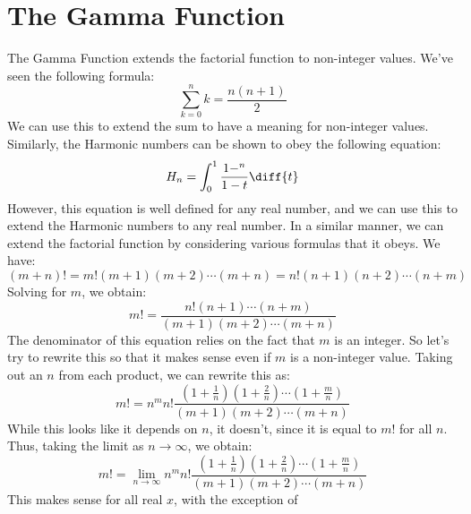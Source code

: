 \documentclass[crop=false,class=book,oneside]{standalone}
\begin{document}
    \section{The Gamma Function}
        The Gamma Function extends the factorial function to
        non-integer values. We've seen the following formula:
        \begin{equation}
            \sum_{k=0}^{n}k=\frac{n(n+1)}{2}
        \end{equation}
        We can use this to extend the sum to have a meaning for
        non-integer values. Similarly, the Harmonic numbers can be
        shown to obey the following equation:
        \begin{equation}
            H_{n}=\int_{0}^{1}\frac{1-^{n}}{1-t}\diff{t}
        \end{equation}
        However, this equation is well defined for any real number,
        and we can use this to extend the Harmonic numbers to any
        real number. In a similar manner, we can extend the factorial
        function by considering various formulas that it obeys. We have:
        \begin{equation}
            (m+n)!=m!(m+1)(m+2)\cdots(m+n)=n!(n+1)(n+2)\cdots(n+m)
        \end{equation}
        Solving for $m$, we obtain:
        \begin{equation}
            m!=\frac{n!(n+1)\cdots(n+m)}{(m+1)(m+2)\cdots(m+n)}
        \end{equation}
        The denominator of this equation relies on the fact that
        $m$ is an integer. So let's try to rewrite this so that it makes
        sense even if $m$ is a non-integer value. Taking out an $n$ from
        each product, we can rewrite this as:
        \begin{equation}
            m!=n^{m}n!
                \frac{(1+\frac{1}{n})(1+\frac{2}{n})\cdots(1+\frac{m}{n})}
                     {(m+1)(m+2)\cdots(m+n)}
        \end{equation}
        While this looks like it depends on $n$, it doesn't, since it is
        equal to $m!$ for all $n$. Thus, taking the limit as
        $n\rightarrow\infty$, we obtain:
        \begin{equation}
            m!=\underset{n\rightarrow\infty}{\lim}n^{m}n!
                \frac{(1+\frac{1}{n})(1+\frac{2}{n})\cdots(1+\frac{m}{n})}
                     {(m+1)(m+2)\cdots(m+n)}
        \end{equation}
        This makes sense for all real $x$, with the exception of
\end{document}
